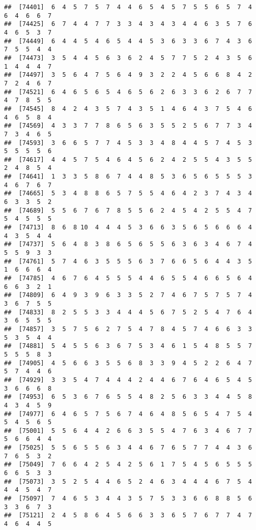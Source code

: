 \documentclass[
]{book}
\begin{document}
\begin{verbatim}
##  [74401]  6  4  5  7  5  7  4  4  6  5  4  5  7  5  5  6  5  7  4  6  4  6  6  7
##  [74425]  6  7  4  4  7  7  3  3  4  3  4  3  4  4  6  3  5  7  6  4  6  5  3  7
##  [74449]  6  4  4  5  4  6  5  4  4  5  3  6  3  3  6  7  4  3  6  7  5  5  4  4
##  [74473]  3  5  4  4  5  6  3  6  2  4  5  7  7  5  2  4  3  5  6  1  4  4  4  7
##  [74497]  3  5  6  4  7  5  6  4  9  3  2  2  4  5  6  6  8  4  2  7  2  4  6  7
##  [74521]  6  4  6  5  6  5  4  6  5  6  2  6  3  3  6  2  6  7  7  4  7  8  5  5
##  [74545]  8  4  2  4  3  5  7  4  3  5  1  4  6  4  3  7  5  4  6  4  6  5  8  4
##  [74569]  4  3  3  7  7  8  6  5  6  3  5  5  2  5  6  7  7  3  4  7  3  4  6  5
##  [74593]  3  6  6  5  7  7  4  5  3  3  4  8  4  4  5  7  4  5  3  5  5  5  5  6
##  [74617]  4  4  5  7  5  4  6  4  5  6  2  4  2  5  5  4  3  5  5  2  4  8  5  4
##  [74641]  1  3  3  5  8  6  7  4  4  8  5  3  6  5  6  5  5  5  3  4  6  7  6  7
##  [74665]  5  3  4  8  8  6  5  7  5  5  4  6  4  2  3  7  4  3  4  6  3  3  5  2
##  [74689]  5  5  6  7  6  7  8  5  5  6  2  4  5  4  2  5  5  4  7  5  4  5  5  5
##  [74713]  8  6  8 10  4  4  4  5  3  6  6  3  5  6  5  6  6  6  4  4  3  5  4  4
##  [74737]  5  6  4  8  3  8  6  5  6  5  5  6  3  6  3  4  6  7  4  5  5  9  3  3
##  [74761]  5  7  4  6  3  5  5  5  6  3  7  6  6  5  6  4  4  3  5  1  6  6  6  4
##  [74785]  4  6  7  6  4  5  5  5  4  4  6  5  5  4  6  6  5  6  4  6  6  3  2  1
##  [74809]  6  4  9  3  9  6  3  3  5  2  7  4  6  7  5  7  5  7  4  3  6  7  5  5
##  [74833]  8  2  5  5  3  3  4  4  4  5  6  7  5  2  5  4  7  6  4  3  6  5  5  5
##  [74857]  3  5  7  5  6  2  7  5  4  7  8  4  5  7  4  6  6  3  3  5  3  5  4  4
##  [74881]  5  4  5  5  6  3  6  7  5  3  4  6  1  5  4  8  5  5  7  5  5  5  8  3
##  [74905]  4  5  6  6  3  5  5  6  8  3  3  9  4  5  2  2  6  4  7  5  7  4  4  6
##  [74929]  3  3  5  4  7  4  4  4  2  4  4  6  7  6  4  6  5  4  5  3  6  6  6  8
##  [74953]  6  5  3  6  7  6  5  5  4  8  2  5  6  3  3  4  4  5  8  4  3  4  5  9
##  [74977]  6  4  6  5  7  5  6  7  4  6  4  8  5  6  5  4  7  5  4  5  4  5  6  5
##  [75001]  5  5  6  4  4  2  6  6  3  5  5  4  7  6  3  4  6  7  7  5  6  6  4  4
##  [75025]  5  5  6  5  5  6  3  4  4  6  7  6  5  7  7  4  4  3  6  7  6  5  3  2
##  [75049]  7  6  6  4  2  5  4  2  5  6  1  7  5  4  5  6  5  5  5  6  6  5  3  3
##  [75073]  3  5  2  5  4  4  6  5  2  4  6  3  4  4  4  6  7  5  4  4  4  5  4  7
##  [75097]  7  4  6  5  3  4  4  3  5  7  5  3  3  6  6  8  8  5  6  3  3  6  7  3
##  [75121]  2  4  5  8  6  4  5  6  6  3  3  6  5  7  6  7  7  4  7  4  6  4  4  5

\end{verbatim}
\end{document}

